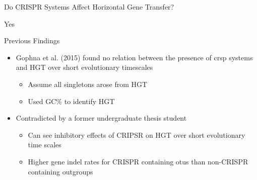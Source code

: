 \documentclass[dvipsnames]{beamer}
\begin{document}
\begin{frame}{}%
    \begin{center}
        \Huge \textcolor{OliveGreen}{Do CRISPR Systems Affect Horizontal Gene Transfer?}
    \end{center}
    \addtocounter{framenumber}{-1}
\end{frame}
\begin{frame}[fragile]{}%
    \begin{center}
        \Huge Yes
    \end{center}
\end{frame}
\begin{frame}[fragile]{Previous Findings}
    \begin{itemize}
        \item<2-> Gophna et al. (2015) found no relation between the presence of \ac{crsp} systems and HGT over short evolutionary timescales
        \begin{itemize}
            \item<3-> Assume all singletons arose from HGT
            \item<4-> Used GC\% to identify HGT
        \end{itemize}
        \item<5-> Contradicted by a former undergraduate thesis student
        \begin{itemize}
            \item<6-> Can see inhibitory effects of CRIPSR on HGT over short evolutionary time scales
            \item<7-> Higher gene indel rates for CRISPR containing \ac{otu}s than non-CRISPR containing outgroups
        \end{itemize}
    \end{itemize}
\end{frame}
\end{document}
